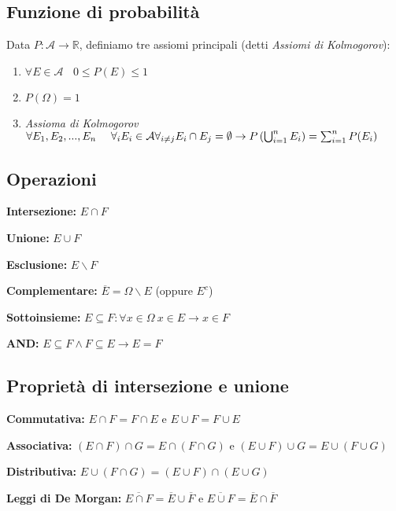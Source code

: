 \documentclass[11pt]{report}
\begin{document}
\subsection{Funzione di probabilità}
Data $P:\mathcal{A} \rightarrow \mathbb{R}$, definiamo tre assiomi principali (detti \textit{Assiomi di Kolmogorov}):
\begin{enumerate}
	\item $\forall E \in \mathcal{A}\ \ \ \ 0 \leq P(E) \leq 1$
	\item $P(\Omega) = 1$
	\item \textit{Assioma di Kolmogorov}\\
	$\forall E_1,E_2,...,E_n\ \ \ \ \forall_iE_i \in \mathcal{A}\\
	\forall_{i \neq j}E_i \cap E_j = \emptyset \rightarrow P\left(\bigcup_{i=1}^{n} E_i\right) = \sum_{i=1}^{n}P(E_i)$
\end{enumerate}
\subsection{Operazioni}
\begin{description}
	\item \textbf{Intersezione:} $E \cap F$
	\item \textbf{Unione:} $E \cup F$
	\item \textbf{Esclusione:} $E \backslash F$
	\item \textbf{Complementare:} $\overline{E} = \Omega \backslash E$ (oppure $E^c$)
	\item \textbf{Sottoinsieme:} $E \subseteq F : \forall x \in \Omega\ x\in E \rightarrow x\in F$
	\item \textbf{AND:} $E \subseteq F \wedge F \subseteq E \rightarrow E = F$
\end{description}
\subsection{Proprietà di intersezione e unione}
\begin{description}
	\item \textbf{Commutativa:} $E \cap F = F \cap E$ e $E \cup F = F \cup E$
	\item \textbf{Associativa:} $(E \cap F) \cap G = E \cap (F \cap G)$ e $(E \cup F) \cup G = E \cup (F \cup G)$
	\item \textbf{Distributiva:} $E \cup (F \cap G) = (E \cup F) \cap (E \cup G)$
	\item \textbf{Leggi di De Morgan:} $\overline{E \cap F} = \overline{E} \cup \overline{F}$ e $\overline{E \cup F} = \overline{E} \cap \overline{F}$
\end{description}
\end{document}
